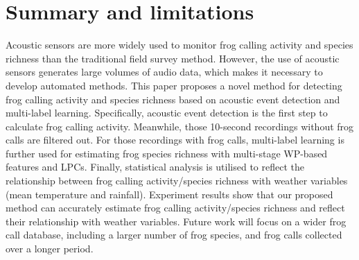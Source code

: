 


\section{Summary and limitations}
Acoustic sensors are more widely used to monitor frog calling activity and species richness than the traditional field survey method. However, the use of acoustic sensors generates large volumes of audio data, which makes it necessary to develop automated methods. This paper proposes a novel method for detecting frog calling activity and species richness based on acoustic event detection and multi-label learning. Specifically,
acoustic event detection is the first step to calculate frog calling activity. Meanwhile, those 10-second recordings without frog calls are filtered out. For those recordings with frog calls, multi-label learning is further used for estimating frog species richness with multi-stage WP-based features and LPCs. Finally, statistical analysis is utilised to reflect the relationship between frog calling activity/species richness with weather variables (mean temperature and rainfall). Experiment results show that our proposed method can accurately estimate frog calling activity/species richness and reflect their relationship with weather variables. Future work will focus on a wider frog call database, including a larger number of frog species, and frog calls collected over a longer period.


